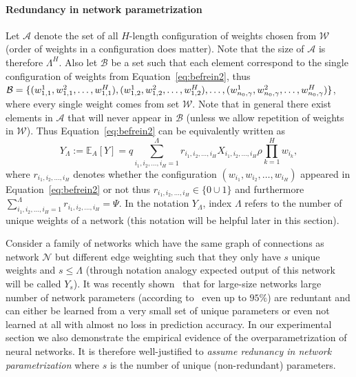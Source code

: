 \documentclass[twoside]{article}
\begin{document}
\paragraph{Redundancy in network parametrization}
Let $\mathcal{A}$ denote the set of all $H$-length configuration of weights chosen from $\mathcal{W}$ (order of weights in a configuration does matter). Note that the size of $\mathcal{A}$ is therefore $\Lambda^H$. Also let $\mathcal{B}$ be a set such that each element correspond to the single configuration of weights from Equation~\ref{eq:befrein2}, thus $\mathcal{B} = \{(w_{1,1}^1,w_{1,1}^2,\dots,w_{1,1}^H),(w_{1,2}^1,w_{1,2}^2,\dots,w_{1,2}^H),\dots,\\(w_{n_0,\gamma}^1,w_{n_0,\gamma}^2,\dots,w_{n_0,\gamma}^H)\}$, where every single weight comes from set $\mathcal{W}$. Note that in general there exist elements in $\mathcal{A}$ that will never appear in $\mathcal{B}$ (unless we allow repetition of weights in $\mathcal{W}$). Thus Equation~\ref{eq:befrein2} can be equivalently written as 
\begin{equation}
Y_{\Lambda} \!:=\! \mathbb{E}_A[Y] \!=\! q\!\!\!\!\sum_{i_1,i_2,\dots,i_H=1}^{\Lambda}\!\!\!\!\!\!\!\!\!\!\!r_{i_1\!,i_2,\dots,i_H}\!X_{i_1,i_2,\dots,i_H}\rho\!\prod_{k = 1}^{H}\!\!w_{i_k},
\label{eq:befapprox}
\end{equation}
where $r_{i_1,i_2,\dots,i_H}$ denotes whether the configuration $(w_{i_1},w_{i_2},\dots,w_{i_H})$ appeared in Equation~\ref{eq:befrein2} or not thus $r_{i_1,i_2,\dots,i_H} \in \{0\cup{1}\}$ and furthermore $\sum_{i_1,i_2,\dots,i_H=1}^{\Lambda}r_{i_1,i_2,\dots,i_H} = \Psi$. In the notation $Y_{\Lambda}$, index $\Lambda$ refers to the number of unique weights of a network (this notation will be helpful later in this section).  

Consider a family of networks which have the same graph of connections as network $\mathcal{N}$ but different edge weighting such that they only have $s$ unique weights and $s \leq \Lambda$ (through notation analogy expected output of this network will be called $Y_s$). It was recently shown~\cite{NIPS2013_5025,DBLP:journals/corr/DentonZBLF14} that for large-size networks large number of network parameters (according to~\cite{NIPS2013_5025} even up to $95\%$) are reduntant and can either be learned from a very small set of unique parameters or even not learned at all with almost no loss in prediction accuracy.  In our experimental section we also demonstrate the empirical evidence of the overparametrization of neural networks. It is therefore well-justified to \textit{assume redunancy in network parametrization} where $s$ is the number of unique (non-redundant) parameters.
\end{document}
